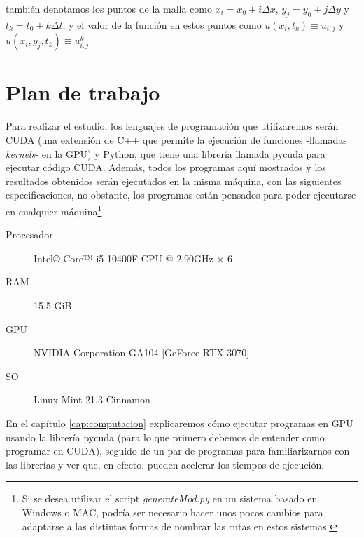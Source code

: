 también denotamos los puntos de la malla como $x_i=x_0+i\Delta x$, $y_j=y_0+j\Delta y$ y $t_k=t_0+k\Delta t$, y el valor de la función en estos puntos como 
$
u(x_i,t_k) \equiv u_{i,j}$ y $ u(x_i,y_j,t_k) \equiv u^k_{i,j}$


\section{Plan de trabajo}
Para realizar el estudio, los lenguajes de programación que utilizaremos serán CUDA (una extensión de C++ que permite la ejecución de funciones -llamadas \emph{kernels}- en la \ac{GPU}) y Python, que tiene una librería llamada pycuda para ejecutar código \ac{CUDA}. Además, todos los programas aquí mostrados y los resultados obtenidos serán ejecutados en la misma máquina, con las siguientes especificaciones, no obstante, los programas están pensados para poder ejecutarse en cualquier máquina\footnote{Si se desea utilizar el script \textit{generateMod.py} en un sistema basado en Windows o MAC, podría ser necesario hacer unos pocos cambios para adaptarse a las distintas formas de nombrar las rutas en estos sistemas.}

\begin{description}
	\item[Procesador] Intel© Core™ i5-10400F CPU @ 2.90GHz × 6
	\item[RAM] 15.5 GiB
	\item[GPU] NVIDIA Corporation GA104 [GeForce RTX 3070]
	\item[SO] Linux Mint 21.3 Cinnamon
\end{description}

En el capítulo \ref{cap:computacion} explicaremos cómo ejecutar programas en \ac{GPU} usando la librería pycuda (para lo que primero debemos de entender como programar en CUDA), seguido de un par de programas para familiarizarnos con las librerías y ver que, en efecto, pueden acelerar los tiempos de ejecución.

